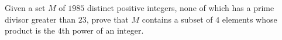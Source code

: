 Given a set $M$ of $1985$ distinct positive integers, none of which has a prime divisor greater than $23$,  prove that $M$ contains a subset of $4$ elements whose product is the $4$th power of an integer.
